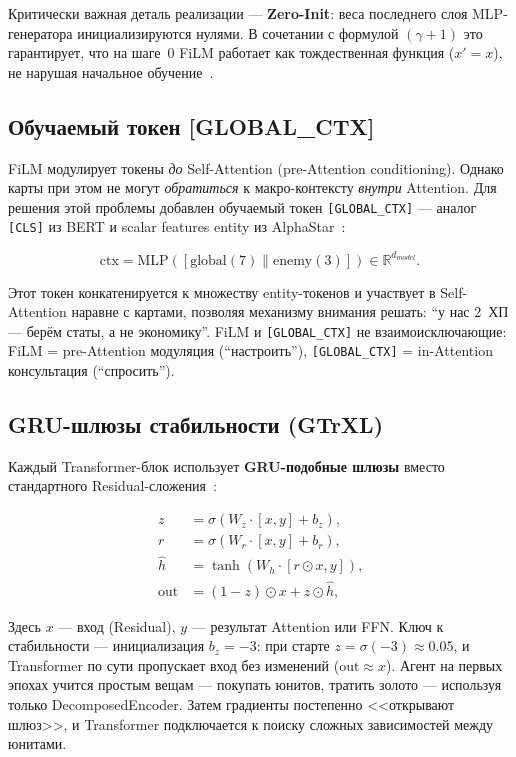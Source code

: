 \documentclass[a4paper,12pt]{extarticle}
\begin{document}
Критически важная деталь реализации --- \textbf{Zero-Init}: веса последнего слоя MLP-генератора инициализируются нулями. В сочетании с формулой $(\gamma + 1)$ это гарантирует, что на шаге~0 FiLM работает как тождественная функция ($x' = x$), не нарушая начальное обучение~\cite{dreamerv3}.

\subsection{Обучаемый токен [GLOBAL\_CTX]}

FiLM модулирует токены \emph{до} Self-Attention (pre-Attention conditioning). Однако карты при этом не могут \emph{обратиться} к макро-контексту \emph{внутри} Attention. Для решения этой проблемы добавлен обучаемый токен \texttt{[GLOBAL\_CTX]} --- аналог \texttt{[CLS]} из BERT и scalar features entity из AlphaStar~\cite{alphastar}:

$$\text{ctx} = \text{MLP}([\text{global}(7) \| \text{enemy}(3)]) \in \mathbb{R}^{d_{model}}\text{.}$$

Этот токен конкатенируется к множеству entity-токенов и участвует в Self-Attention наравне с картами, позволяя механизму внимания решать: ``у нас 2~ХП --- берём статы, а не экономику''. FiLM и \texttt{[GLOBAL\_CTX]} не взаимоисключающие: FiLM = pre-Attention модуляция (``настроить''), \texttt{[GLOBAL\_CTX]} = in-Attention консультация (``спросить'').

\subsection{GRU-шлюзы стабильности (GTrXL)}

Каждый Transformer-блок использует \textbf{GRU-подобные шлюзы} вместо стандартного Residual-сложения~\cite{gtrxl}:

\begin{align}
z &= \sigma(W_z \cdot [x, y] + b_z)\text{,} \\
r &= \sigma(W_r \cdot [x, y] + b_r)\text{,} \\
\hat{h} &= \tanh(W_h \cdot [r \odot x, y])\text{,} \\
\text{out} &= (1 - z) \odot x + z \odot \hat{h}\text{,}
\end{align}

Здесь $x$ --- вход (Residual), $y$ --- результат Attention или FFN. Ключ к стабильности --- инициализация $b_z = -3$: при старте $z = \sigma(-3) \approx 0.05$, и Transformer по сути пропускает вход без изменений ($\text{out} \approx x$). Агент на первых эпохах учится простым вещам --- покупать юнитов, тратить золото --- используя только DecomposedEncoder. Затем градиенты постепенно <<открывают шлюз>>, и Transformer подключается к поиску сложных зависимостей между юнитами.
\end{document}
